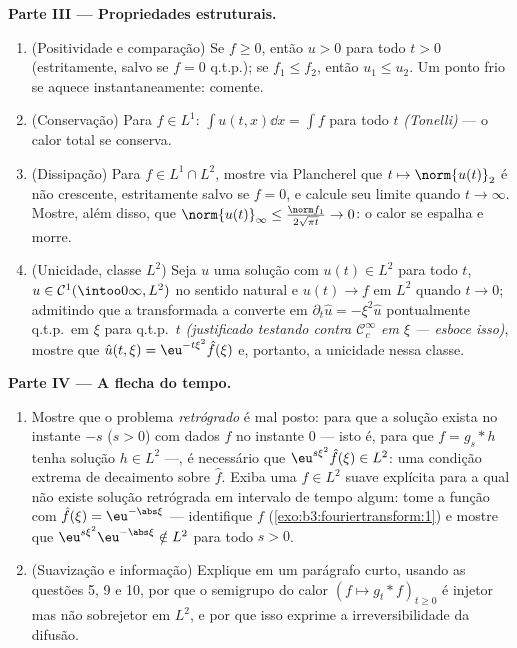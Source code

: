 \begin{problem}[{Problema de fim de semana --- $\partial_tu =
\partial^2_{xx}u$, resolvida de
ponta a ponta}]
\medskip
\noindent\textbf{Parte III --- Propriedades estruturais.}
\begin{enumerate}[resume]
  \item (Positividade e comparação) Se $f \geq 0$, então $u > 0$ para
        todo $t > 0$ (estritamente, salvo se $f = 0$ q.t.p.); se
        $f_1 \leq f_2$, então $u_1 \leq u_2$. Um ponto frio se aquece instantaneamente:
        comente.
  \item (Conservação) Para $f \in L^1$: $\int u(t, x)\dd x =
        \int f$ para todo $t$ \emph{(Tonelli)}
        --- o calor total se conserva.
  \item (Dissipação) Para $f \in L^1\cap L^2$, mostre via Plancherel que $t \mapsto \norm{u(t)}_2$ é não
        crescente, estritamente salvo se $f = 0$, e calcule seu
        limite quando $t \to \infty$. Mostre, além disso, que $\norm{u(t)}_\infty \leq \frac{\norm
        f_1}{2\sqrt{\pi t}} \to 0$: o calor se
        espalha e morre.
  \item (Unicidade, classe $L^2$) Seja $u$ uma solução com $u(t) \in L^2$
        para todo $t$, $u \in \mathcal
        C^1(\intoo0\infty, L^2)$ no sentido natural e $u(t) \to f$ em $L^2$
        quando $t\to0$; admitindo que a transformada a converte em
        $\partial_t\hat u =
        -\xi^2\hat u$ pontualmente q.t.p.\ em $\xi$ para q.t.p.\ $t$
        \emph{(justificado testando contra $\mathcal
        C_c^\infty$ em $\xi$ --- esboce
        isso)}, mostre que $\hat u(t,\xi) = \eu^{-t\xi^2}\hat f(\xi)$ e, portanto, a unicidade nessa classe.
\end{enumerate}

\medskip
\noindent\textbf{Parte IV --- A flecha do tempo.}
\begin{enumerate}[resume]
  \item Mostre que o problema \emph{retrógrado} é mal posto: para que a
        solução exista no instante $-s$ ($s > 0$) com dados
        $f$ no instante $0$ --- isto é, para que $f = g_s * h$ tenha
        solução $h \in L^2$ ---, é necessário que $\eu^{s\xi^2}\hat f(\xi) \in L^2$: uma condição extrema
        de decaimento sobre $\hat f$. Exiba uma $f
        \in L^2$ suave
        explícita para a qual não existe solução retrógrada em
        intervalo de tempo algum: tome a função com $\hat f(\xi) =
        \eu^{-\abs\xi}$ ---
        identifique $f$ (\cref{exo:b3:fouriertransform:1}) e mostre que $\eu^{s\xi^2}\eu^{-\abs\xi} \notin L^2$ para todo
        $s >
        0$.
  \item (Suavização e informação) Explique em um parágrafo curto,
        usando as questões 5, 9 e 10, por que o semigrupo do calor
        $(f \mapsto g_t * f)_{t\geq0}$ é injetor mas não sobrejetor em $L^2$, e por que isso
        exprime a irreversibilidade da difusão.
\end{enumerate}


\end{problem}
